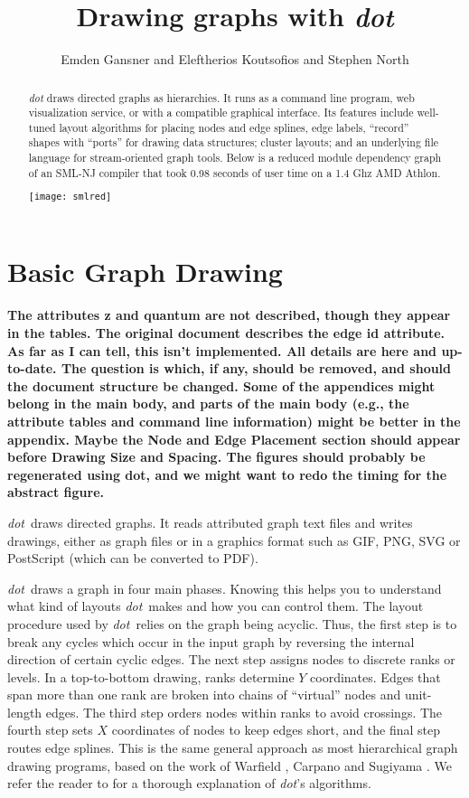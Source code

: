 \documentclass[11pt]{article}
\author{Emden Gansner and Eleftherios Koutsofios and Stephen North}
\date{\lastedited}
\def\dot{{\it dot}}
\begin{document}

\title{Drawing graphs with \dot}
\maketitle
\begin{abstract}
\noindent
{\dot} draws directed graphs as hierarchies.
It runs as a command line program, web visualization
service, or with a compatible graphical interface.
Its features include well-tuned layout algorithms
for placing nodes and edge splines, edge labels,
``record'' shapes with ``ports'' for drawing data structures;
cluster layouts; and an underlying file language for
stream-oriented graph tools.
Below is a reduced module dependency graph of an SML-NJ compiler
that took 0.98 seconds of user time on a 1.4 Ghz AMD Athlon.

\vspace*{.25in}
\centerline{
	\texttt{[image: smlred]}
}
\end{abstract}

\newpage
\section{Basic Graph Drawing}

{\bf The attributes z and quantum are not described, though they
appear in the tables. The original document describes the edge id
attribute. As far as I can tell, this isn't implemented.
All details are here and up-to-date.
The question is which, if any, should be removed,
and should the document structure be changed. Some of the
appendices might belong in the main body, and parts of the main
body (e.g., the attribute tables and command line information) 
might be better in the appendix. Maybe the Node and Edge Placement
section should appear before Drawing Size and Spacing.
The figures should probably be regenerated using dot, and we might
want to redo the timing for the abstract figure.}
\fi

\dot\ draws directed graphs. It reads attributed graph text files and
writes drawings, either as graph files or in a graphics format
such as GIF, PNG, SVG or PostScript (which can be converted to PDF).

\dot\ draws a graph in four main phases.
Knowing this helps you to understand what kind of
layouts \dot\ makes and how you can control them.
The layout procedure used by \dot\ relies on the graph
being acyclic. Thus, the first step is to break any
cycles which occur in the input graph by reversing
the internal direction of certain cyclic edges.
The next step assigns nodes to discrete ranks or levels.
In a top-to-bottom drawing, ranks determine $Y$ coordinates.
Edges that span more than one rank are broken into chains
of ``virtual'' nodes and unit-length edges.
The third step orders nodes within ranks to avoid crossings.
The fourth step sets $X$ coordinates of nodes to keep edges short,
and the final step routes edge splines.
This is the same general approach as most hierarchical graph drawing
programs, based on the work of Warfield \cite{warfield},
Carpano \cite{carpano} and Sugiyama \cite{stt}.
We refer the reader to \cite{gknv:methods}
for a thorough explanation of \dot's algorithms.
\end{document}
